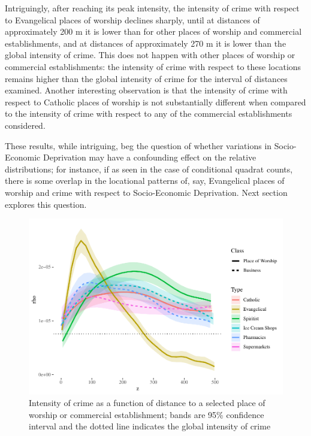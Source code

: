 \documentclass[smallextended]{svjour3}       %
\begin{document}
Intriguingly, after reaching its peak intensity, the intensity of crime
with respect to Evangelical places of worship declines sharply, until at
distances of approximately 200 m it is lower than for other places of
worship and commercial establishments, and at distances of approximately
270 m it is lower than the global intensity of crime. This does not
happen with other places of worship or commercial establishments: the
intensity of crime with respect to these locations remains higher than
the global intensity of crime for the interval of distances examined.
Another interesting observation is that the intensity of crime with
respect to Catholic places of worship is not substantially different
when compared to the intensity of crime with respect to any of the
commercial establishments considered.

These results, while intriguing, beg the question of whether variations
in Socio-Economic Deprivation may have a confounding effect on the
relative distributions; for instance, if as seen in the case of
conditional quadrat counts, there is some overlap in the locational
patterns of, say, Evangelical places of worship and crime with respect
to Socio-Economic Deprivation. Next section explores this question.

\begin{figure}
\centering
\includegraphics{Moral_Communities_and_Crime_v1_files/figure-latex/figure-plot-relative-distribution-1.pdf}
\caption{\label{fig:plot-relative-distribution}Intensity of crime as a
function of distance to a selected place of worship or commercial
establishment; bands are 95\% confidence interval and the dotted line
indicates the global intensity of crime}
\end{figure}
\end{document}
